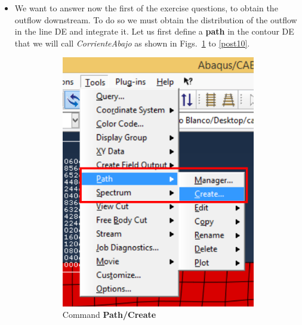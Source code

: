 \begin{itemize}
  \item We want to answer now the first of the exercise questions, to
    obtain the outflow downstream. To do so we must obtain the
    distribution of the outflow in the line DE and integrate it. Let
    us first define a \textbf{path} in the contour DE that we will
    call \textit{CorrienteAbajo} as shown in Figs.~\ref{post05} to
    \ref{post10}.

  \begin{figure}[!h]
    \centering
    \begin{subfigure}[!h]{0.20\textwidth}
      \includegraphics[width=\textwidth]{./body/images/post05.pdf}
      \caption{Command \textbf{Path/Create}}
      \label{post05}
    \end{subfigure}%
    \begin{subfigure}[!h]{0.40\textwidth}

\end{subfigure}
\end{figure}
\end{itemize}
